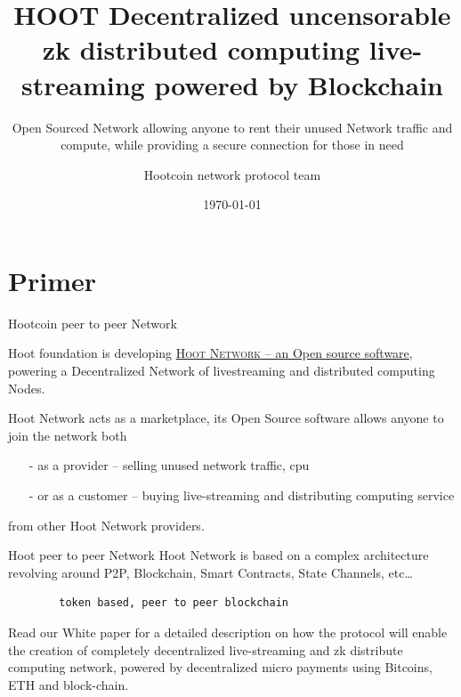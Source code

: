 \documentclass[10pt]{beamer}
\title{HOOT Decentralized uncensorable zk distributed computing live-streaming powered by Blockchain}
\subtitle{Open Sourced Network allowing anyone to rent their unused Network traffic and compute, while providing a secure connection for those in need}
\date{\today}
\author{Hootcoin network protocol team}
\institute{Hootcoin Foundation}
\newcommand{\themename}{\textbf{\textsc{metropolis}}\xspace}
\begin{document}
\maketitle


\section{Primer}

\begin{frame}[fragile]{Hootcoin peer to peer Network }

  Hoot foundation is developing \href{https://onhoot.com/tokensale}{\textsc{Hoot Network} – an Open source software}, powering a Decentralized Network of livestreaming and distributed computing Nodes.
  

Hoot Network acts as a marketplace, its Open Source software allows anyone to join the network both 

\begin{itemize}
\item[-]as a provider – selling unused network traffic, cpu
\item[-]or as a customer – buying live-streaming and distributing computing service
\end{itemize}
 from other Hoot Network providers. 
\end{frame}
\begin{frame}[fragile]{Hoot peer to peer Network }
  Hoot Network is based on a complex architecture revolving around   P2P, Blockchain, Smart Contracts, State Channels, etc\ldots
    \begin{verbatim}  
        token based, peer to peer blockchain 
  \end{verbatim}
  
   Read our White paper for a detailed description on how the protocol will enable the creation of completely decentralized live-streaming and zk distribute computing network, powered by decentralized micro payments using Bitcoins, ETH and block-chain. 


\end{frame}
\end{document}
